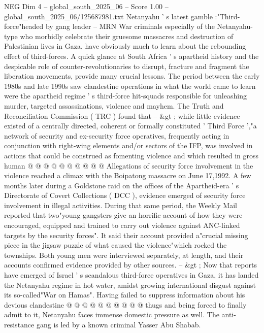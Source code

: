 \begin{textsample}{NEG Dim 4 – global\_south\_2025\_06 – Score 1.00 – global\_south\_2025\_06/125687981.txt}  \label{ex:f4_neg_104}
Netanyahu ' s latest gamble :"Third-force"headed by gang leader -- MRN War criminals especially of the Netanyahu-type who morbidly celebrate their gruesome massacres and destruction of Palestinian lives in Gaza, have obviously much to learn about the rebounding effect of third-forces.
A quick glance at South Africa ' s apartheid history and the despicable role of counter-revolutionaries to disrupt, fracture and fragment the liberation movements, provide many crucial lessons.
The period between the early 1980s and late 1990s saw clandestine operations in what the world came to learn were the apartheid regime ' s third-force hit-squads responsible for unleashing murder, targeted assassinations, violence and mayhem.
The Truth and Reconciliation Commission ( TRC ) found that -- \&gt ; while little evidence existed of a centrally directed, coherent or formally constituted ' Third Force ',"a network of security and ex-security force operatives, frequently acting in conjunction with right-wing elements and/or sectors of the IFP, was involved in actions that could be construed as fomenting violence and which resulted in gross human @ @ @ @ @ @ @ @ @ @ Allegations of security force involvement in the violence reached a climax with the Boipatong massacre on June 17,1992.
A few months later during a Goldstone raid on the offices of the Apartheid-era ' s Directorate of Covert Collections ( DCC ), evidence emerged of security force involvement in illegal activities.
During that same period, the Weekly Mail reported that two"young gangsters give an horrific account of how they were encouraged, equipped and trained to carry out violence against ANC-linked targets by the security forces".
It said their account provided a"crucial missing piece in the jigsaw puzzle of what caused the violence"which rocked the townships.
Both young men were interviewed separately, at length, and their accounts confirmed evidence provided by other sources. -- \&gt ; Now that reports have emerged of Israel ' s scandalous third-force operatives in Gaza, it has landed the Netanyahu regime in hot water, amidst growing international disgust against its so-called"War on Hamas".
Having failed to suppress information about his devious clandestine @ @ @ @ @ @ @ @ @ @ thugs and being forced to finally admit to it, Netanyahu faces immense domestic pressure as well.
The anti-resistance gang is led by a known criminal Yasser Abu Shabab.

\end{textsample}
